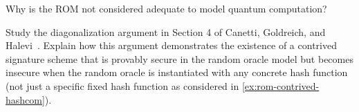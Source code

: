 \begin{exercise}[Optional]
  Why is the ROM not considered adequate to model quantum computation?
\end{exercise}

\begin{exercise}[Optional]
  Study the diagonalization argument in Section 4 of Canetti, Goldreich, and Halevi~\cite{STOC:CanGolHal98}.
  Explain how this argument demonstrates the existence of a contrived signature scheme that is provably secure in the random oracle model but becomes insecure when the random oracle is instantiated with any concrete hash function (not just a specific fixed hash function as considered in \autoref{ex:rom-contrived-hashcom}).
\end{exercise}
